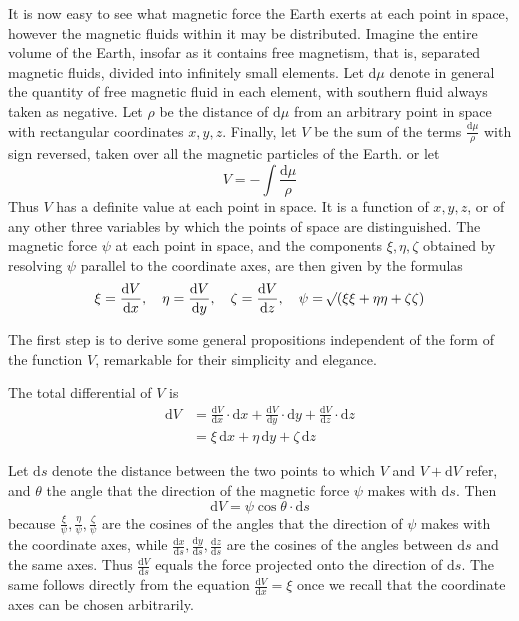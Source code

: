 It is now easy to see what magnetic force the Earth exerts at each point in space, however the magnetic fluids within it may be distributed. Imagine the entire volume of the Earth, insofar as it contains free magnetism, that is, separated magnetic fluids, divided into infinitely small elements. Let $\mathrm{d}\mu$ denote in general the quantity of free magnetic fluid in each element, with southern fluid always taken as negative. Let $\rho$ be the distance of $\mathrm{d}\mu$ from an arbitrary point in space with rectangular coordinates $x,y,z$. Finally, let $V$ be the sum of the terms $\frac{\mathrm{d}\mu}{\rho}$ with sign reversed, taken over all the magnetic particles of the Earth. or let
\[
V=-\int\frac{\mathrm{d}\mu}{\rho}
\]
Thus $V$ has a definite value at each point in space. It is a function of $x,y,z$, or of any other three variables by which the points of space are distinguished. The magnetic force $\psi$ at each point in space, and the components $\xi,\eta,\zeta$ obtained by resolving $\psi$ parallel to the coordinate axes, are then given by the formulas
\[
\xi=\frac{\mathrm{d}V}{\mathrm{d}x},\quad \eta=\frac{\mathrm{d}V}{\mathrm{d}y},\quad \zeta=\frac{\mathrm{d}V}{\mathrm{d}z},\quad \psi=\mathord{{}^{}\!\surd}(\xi\xi+\eta\eta+\zeta\zeta)
\]

The first step is to derive some general propositions independent of the form of the function $V$, remarkable for their simplicity and elegance.

The total differential of $V$ is
\[
\begin{aligned}
\mathrm{d}V&=\frac{\mathrm{d}V}{\mathrm{d}x}\cdot\mathrm{d}x+\frac{\mathrm{d}V}{\mathrm{d}y}\cdot\mathrm{d}y+\frac{\mathrm{d}V}{\mathrm{d}z}\cdot\mathrm{d}z\\
&=\xi\,\mathrm{d}x+\eta\,\mathrm{d}y+\zeta\,\mathrm{d}z
\end{aligned}
\]

Let $\mathrm{d}s$ denote the distance between the two points to which $V$ and $V+\mathrm{d}V$ refer, and $\theta$ the angle that the direction of the magnetic force $\psi$ makes with $\mathrm{d}s$. Then
\[
\mathrm{d}V=\psi\cos\theta\cdot\mathrm{d}s
\]
because $\frac{\xi}{\psi},\frac{\eta}{\psi},\frac{\zeta}{\psi}$ are the cosines of the angles that the direction of $\psi$ makes with the coordinate axes, while $\frac{\mathrm{d}x}{\mathrm{d}s},\frac{\mathrm{d}y}{\mathrm{d}s},\frac{\mathrm{d}z}{\mathrm{d}s}$ are the cosines of the angles between $\mathrm{d}s$ and the same axes. Thus $\frac{\mathrm{d}V}{\mathrm{d}s}$ equals the force projected onto the direction of $\mathrm{d}s$. The same follows directly from the equation $\frac{\mathrm{d}V}{\mathrm{d}x}=\xi$ once we recall that the coordinate axes can be chosen arbitrarily.

